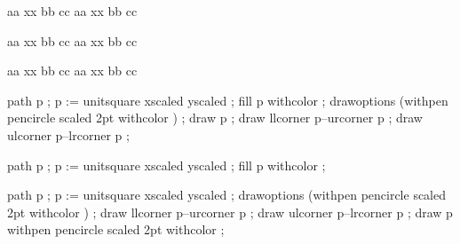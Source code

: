 \unskip \quad \ignorespaces

\bTABLE
\bTR \bTD aa \eTD \bTD[nr=2] xx \eTD \bTD bb \eTD \bTD cc \eTD \eTR \bTR \eTR
\bTR \bTD aa \eTD \bTD[nr=2] xx \eTD \bTD bb \eTD \bTD cc \eTD \eTR \bTR \eTR
\eTABLE

\unskip \quad \ignorespaces

\bTABLE
\bTR \bTD aa \eTD \bTD[nr=2] xx \eTD \bTD bb \eTD \bTD cc \eTD \eTR \bTR \eTR
\bTR \bTD aa \eTD \bTD[nr=2] xx \eTD \bTD bb \eTD \bTD cc \eTD \eTR
\eTABLE

\unskip \quad \ignorespaces

\bTABLE
\bTR \bTD aa \eTD \bTD[nr=2] xx \eTD \bTD bb \eTD \bTD cc \eTD \eTR
\bTR \bTD aa \eTD \bTD[nr=2] xx \eTD \bTD bb \eTD \bTD cc \eTD \eTR \bTR \eTR
\eTABLE

\unskip \egroup
\StopExample

\StartExample
{}
  path p ; p := unitsquare xscaled \overlaywidth yscaled \overlayheight ;
  fill p withcolor  ;
  drawoptions (withpen pencircle scaled 2pt withcolor ) ;
  draw p ; draw llcorner p--urcorner p ; draw ulcorner p--lrcorner p ;
\stopuniqueMPgraphic


\bTABLE[width=.2\textwidth,background=crossed,frame=off]
\bTR \bTD[align=left]   \getbuffer[knuth-1] \eTD
     \bTD[align=middle] \getbuffer[knuth-1] \eTD
     \bTD[align=right]  \getbuffer[knuth-1] \eTD \eTR
\eTABLE
\StopExample

\StartExample
{}
  path p ; p := unitsquare xscaled \overlaywidth yscaled \overlayheight ;
  fill p withcolor  ;
\stopuniqueMPgraphic

  path p ; p := unitsquare xscaled \overlaywidth yscaled \overlayheight ;
  drawoptions (withpen pencircle scaled 2pt withcolor ) ;
  draw llcorner p--urcorner p ; draw ulcorner p--lrcorner p ;
  draw p withpen pencircle scaled 2pt withcolor  ;
\stopuniqueMPgraphic


\bTABLE[width=.2\textwidth,background={fill,foreground,cross},frame=off]
\bTR \bTD[align=left]   \getbuffer[knuth-1] \eTD
     \bTD[align=middle] \getbuffer[knuth-1] \eTD
     \bTD[align=right]  \getbuffer[knuth-1] \eTD \eTR
\eTABLE
\StopExample

